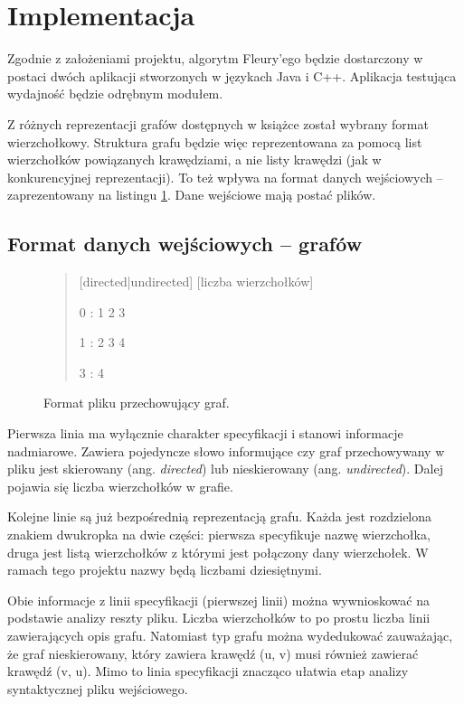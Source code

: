 \section{Implementacja}

Zgodnie z założeniami projektu, algorytm Fleury'ego będzie dostarczony w postaci dwóch aplikacji stworzonych w językach Java i C++. 
Aplikacja testująca wydajność będzie odrębnym modułem.

Z różnych reprezentacji grafów dostępnych w książce \cite{Cormen} został wybrany format wierzchołkowy.
Struktura grafu będzie więc reprezentowana za pomocą list wierzchołków powiązanych krawędziami, a nie listy krawędzi (jak w konkurencyjnej reprezentacji). To też wpływa na format danych wejściowych -- zaprezentowany na listingu \ref{FormatPliku}. Dane wejściowe mają postać plików.

\subsection{Format danych wejściowych -- grafów}

\begin{figure}
\begin{quote}
\label{FormatPliku}
[directed|undirected] [liczba wierzchołków]

0 : 1 2 3

1 : 2 3 4

3 : 4
\end{quote}
\caption{Format pliku przechowujący graf.}
\end{figure}


Pierwsza linia ma wyłącznie charakter specyfikacji i stanowi informacje nadmiarowe.
Zawiera pojedyncze słowo informujące czy graf przechowywany w pliku jest skierowany (ang. \textit{directed}) lub nieskierowany (ang. \textit{undirected}). 
Dalej pojawia się liczba wierzchołków w grafie.

Kolejne linie są już bezpośrednią reprezentacją grafu.
Każda jest rozdzielona znakiem dwukropka na dwie części: pierwsza specyfikuje nazwę wierzchołka, druga jest listą wierzchołków z którymi jest połączony dany wierzchołek.
W ramach tego projektu nazwy będą liczbami dziesiętnymi.

Obie informacje z linii specyfikacji (pierwszej linii) można wywnioskować na podstawie analizy reszty pliku.
Liczba wierzchołków to po prostu liczba linii zawierających opis grafu.
Natomiast typ grafu można wydedukować zauważając, że graf nieskierowany, który zawiera krawędź (u, v) musi również zawierać krawędź (v, u).
Mimo to linia specyfikacji znacząco ułatwia etap analizy syntaktycznej pliku wejściowego.

